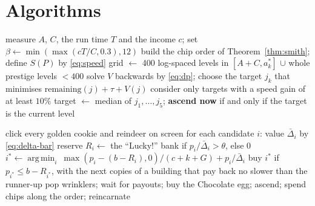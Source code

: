\documentclass[11pt,a4paper]{article}
\numberwithin{equation}{section}
\theoremstyle{definition}
\theoremstyle{remark}
\newcommand{\Lucky}{\textup{``Lucky!''}}
\DeclareMathOperator*{\argmin}{arg\,min}
\begin{document}
\appendix
\section{Algorithms}\label{app:algorithms}
\begin{algorithm}[H]
\caption{Ascension planner (every five seconds)}
\begin{algorithmic}[1]
\State measure $A$, $C$, the run time $T$ and the income $c$; set $\beta\gets\min(\max(cT/C,0.3),12)$
\State build the chip order of Theorem~\ref{thm:smith}; define $S(P)$ by \eqref{eq:speed}
  \State grid $\gets$ 400 log-spaced levels in $[A+C,a^\ast_k]$ $\cup$ whole prestige levels $<400$
  \State solve $V$ backwards by \eqref{eq:dp}; choose the target $j_k$ that minimises $\mathrm{remaining}(j)+\tau+V(j)$
  \State consider only targets with a speed gain of at least $10\%$
\EndFor
\State target $\gets$ median of $j_1,\ldots,j_5$; \textbf{ascend now} if and only if the target is the current level
\end{algorithmic}
\end{algorithm}

\begin{algorithm}[H]
\caption{Automation tick (every frame; clicks on a separate 50\,ms timer)}
\begin{algorithmic}[1]
\State click every golden cookie and reindeer on screen
  \State for each candidate $i$: value $\bar\Delta_i$ by \eqref{eq:delta-bar}
  \Repeat
    \State reserve $R_i\gets$ the \Lucky{} bank if $p_i/\bar\Delta_i>\theta$, else $0$
    \State $i^\ast\gets\argmin_i\ \max(p_i-(b-R_i),0)/(c+k+G)+p_i/\bar\Delta_i$
    \State buy $i^\ast$ if $p_{i^\ast}\le b-R_{i^\ast}$, with the next copies of a building that pay back no slower than the runner-up
\EndIf
{}
  \State pop wrinklers; wait for payouts; buy the Chocolate egg; ascend; spend chips along the order; reincarnate
\EndIf
\end{algorithmic}
\end{algorithm}
\end{document}
